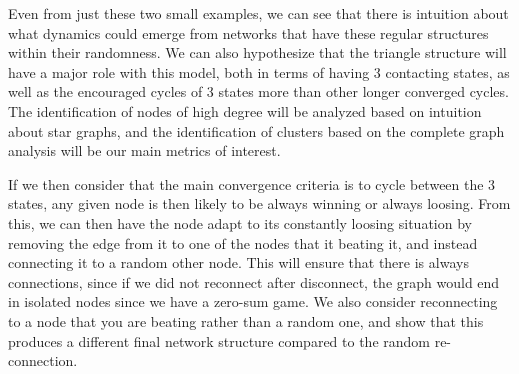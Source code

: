 \documentclass[letterpaper, 12 pt, conference]{ieeeconf}
\begin{document}
\par 
Even from just these two small examples, we can see that there is intuition about what dynamics could emerge from networks that have these regular structures within their randomness. We can also hypothesize that the triangle structure will have a major role with this model, both in terms of having 3 contacting states, as well as the encouraged cycles of 3 states more than other longer converged cycles. The identification of nodes of high degree will be analyzed based on intuition about star graphs, and the identification of clusters based on the complete graph analysis will be our main metrics of interest. 
\par
If we then consider that the main convergence criteria is to cycle between the 3 states, any given node is then likely to be always winning or always loosing. From this, we can then have the node adapt to its constantly loosing situation by removing the edge from it to one of the nodes that it beating it, and instead connecting it to a random other node. This will ensure that there is always connections, since if we did not reconnect after disconnect, the graph would end in isolated nodes since we have a zero-sum game. We also consider reconnecting to a node that you are beating rather than a random one, and show that this produces a different final network structure compared to the random re-connection. 
\newpage
\end{document}
